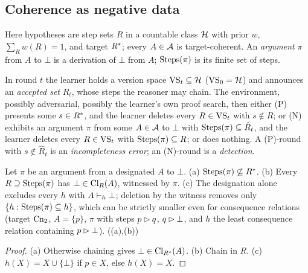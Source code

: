 \subsection{Coherence as negative data}\label{sec:coherence:negative}

Here hypotheses are step sets $R$ in a countable class $\mathcal{H}$ with prior $w$, $\sum_Rw(R)=1$, and target $R^{*}$; every $A\in\mathcal{A}$ is target-coherent. An \emph{argument} $\pi$ from $A$ to $\bot$ is a derivation of $\bot$ from $A$; $\mathrm{Steps}(\pi)$ is its finite set of steps.

\begin{definition}\label{def:coherence:protocol}
In round $t$ the learner holds a version space $\mathrm{VS}_t\subseteq\mathcal{H}$ ($\mathrm{VS}_0=\mathcal{H}$) and announces an \emph{accepted set} $\hat R_t$, whose steps the reasoner may chain. The environment, possibly adversarial, possibly the learner's own proof search, then either \textup{(P)} presents some $s\in R^{*}$, and the learner deletes every $R\in\mathrm{VS}_t$ with $s\notin R$; or \textup{(N)} exhibits an argument $\pi$ from some $A\in\mathcal{A}$ to $\bot$ with $\mathrm{Steps}(\pi)\subseteq\hat R_t$, and the learner deletes every $R\in\mathrm{VS}_t$ with $\mathrm{Steps}(\pi)\subseteq R$; or does nothing. A (P)-round with $s\notin\hat R_t$ is an \emph{incompleteness error}; an (N)-round is a \emph{detection}.
\end{definition}

\begin{lemma}\label{lem:coherence:bag}
Let $\pi$ be an argument from a designated $A$ to $\bot$. \textup{(a)} $\mathrm{Steps}(\pi)\not\subseteq R^{*}$. \textup{(b)} Every $R\supseteq\mathrm{Steps}(\pi)$ has $\bot\in\mathrm{Cl}_R(A)$, witnessed by $\pi$. \textup{(c)} The designation alone excludes every $h$ with $A\vdash_h\bot$; deletion by the witness removes only $\{h:\mathrm{Steps}(\pi)\subseteq h\}$, which can be strictly smaller even for consequence relations (target $\mathrm{Cn}_2$, $A=\{p\}$, $\pi$ with steps $p\rhd q$, $q\rhd\bot$, and $h$ the least consequence relation containing $p\rhd\bot$). \hfill{} ((a),(b))
\end{lemma}

\begin{proof}
(a) Otherwise chaining gives $\bot\in\mathrm{Cl}_{R^{*}}(A)$. (b) Chain in $R$. (c) $h(X)=X\cup\{\bot\}$ if $p\in X$, else $h(X)=X$.
\end{proof}

